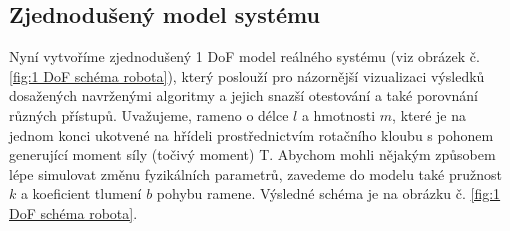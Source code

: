 \subsection{Zjednodušený model systému}
Nyní vytvoříme zjednodušený 1 DoF model reálného systému (viz obrázek č. \ref{fig:1 DoF schéma robota}), který poslouží pro názornější vizualizaci výsledků dosažených navrženými algoritmy a jejich snazší otestování a také porovnání různých přístupů.
Uvažujeme, rameno o délce $l$ a hmotnosti $m$, které je na jednom konci
ukotvené na hřídeli prostřednictvím rotačního kloubu s pohonem generující moment síly (točivý moment) T. Abychom mohli
nějakým způsobem lépe simulovat změnu fyzikálních parametrů, zavedeme do modelu
také pružnost $k$ a koeficient tlumení $b$ pohybu ramene. Výsledné schéma je na
obrázku č. \ref{fig:1 DoF schéma robota}.

